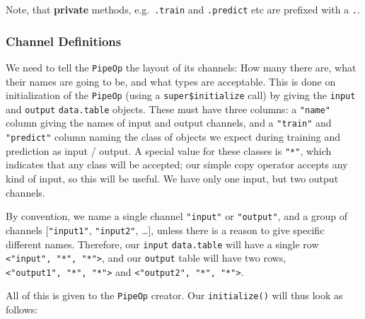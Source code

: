 \documentclass[
]{scrbook}
\begin{document}
Note, that \textbf{private} methods, e.g.~\texttt{.train} and \texttt{.predict} etc are prefixed with a \texttt{.}.

\hypertarget{channel-definitions}{%
\subsubsection{Channel Definitions}\label{channel-definitions}}

We need to tell the \texttt{PipeOp} the layout of its channels: How many there are, what their names are going to be, and what types are acceptable.
This is done on initialization of the \texttt{PipeOp} (using a \texttt{super\$initialize} call) by giving the \texttt{input} and \texttt{output} \texttt{data.table} objects.
These must have three columns: a \texttt{"name"} column giving the names of input and output channels, and a \texttt{"train"} and \texttt{"predict"} column naming the class of objects we expect during training and prediction as input / output.
A special value for these classes is \texttt{"*"}, which indicates that any class will be accepted; our simple copy operator accepts any kind of input, so this will be useful. We have only one input, but two output channels.

By convention, we name a single channel \texttt{"input"} or \texttt{"output"}, and a group of channels {[}\texttt{"input1"}, \texttt{"input2"}, \ldots{]}, unless there is a reason to give specific different names. Therefore, our \texttt{input} \texttt{data.table} will have a single row \texttt{\textless{}"input",\ "*",\ "*"\textgreater{}}, and our \texttt{output} table will have two rows, \texttt{\textless{}"output1",\ "*",\ "*"\textgreater{}} and \texttt{\textless{}"output2",\ "*",\ "*"\textgreater{}}.

All of this is given to the \texttt{PipeOp} creator. Our \texttt{initialize()} will thus look as follows:
\end{document}
